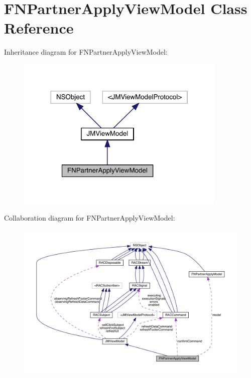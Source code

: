 \hypertarget{interface_f_n_partner_apply_view_model}{}\section{F\+N\+Partner\+Apply\+View\+Model Class Reference}
\label{interface_f_n_partner_apply_view_model}


Inheritance diagram for F\+N\+Partner\+Apply\+View\+Model\+:\nopagebreak
\begin{figure}[H]
\begin{center}
\leavevmode
\includegraphics[width=284pt]{interface_f_n_partner_apply_view_model__inherit__graph}
\end{center}
\end{figure}


Collaboration diagram for F\+N\+Partner\+Apply\+View\+Model\+:\nopagebreak
\begin{figure}[H]
\begin{center}
\leavevmode
\includegraphics[width=350pt]{interface_f_n_partner_apply_view_model__coll__graph}
\end{center}
\end{figure}
